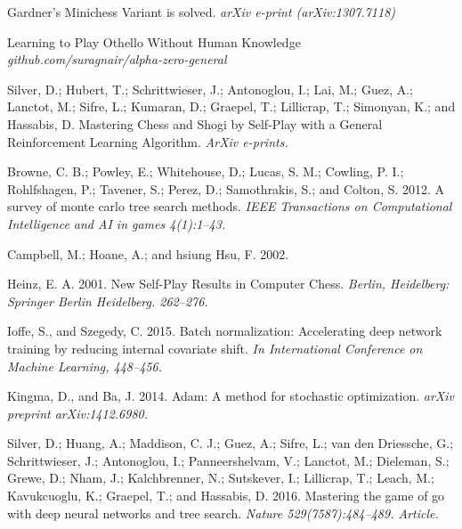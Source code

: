 \documentclass[11pt]{article}
\begin{document}
\begin{thebibliography}{}

\newblock Gardner's Minichess Variant is solved. {\em arXiv e-print (arXiv:1307.7118) }

\newblock Learning to Play Othello Without Human Knowledge {\em github.com/suragnair/alpha-zero-general}

\newblock [Silver et al. 2017a] Silver, D.; Hubert, T.; Schrittwieser, J.; Antonoglou, I.; Lai, M.; Guez, A.; Lanctot, M.; Sifre, L.; Kumaran, D.; Graepel, T.; Lillicrap, T.; Simonyan, K.; and Hassabis, D.
\newblock Mastering Chess and Shogi by Self-Play with a General Reinforcement Learning Algorithm. {\em ArXiv e-prints.}

\newblock [Browne et al. 2012] Browne, C. B.; Powley, E.; Whitehouse, D.; Lucas, S. M.; Cowling, P. I.; Rohlfshagen, P.; Tavener, S.; Perez, D.; Samothrakis, S.; and Colton, S. 2012. 
\newblock A survey of monte carlo tree search methods. {\em IEEE Transactions on Computational Intelligence and AI in games 4(1):1–43.}

 Campbell, M.; Hoane, A.; and hsiung Hsu, F. 2002. 

\newblock [Heinz 2001] Heinz, E. A. 2001. 
\newblock New Self-Play Results in Computer Chess. {\em Berlin, Heidelberg:  Springer Berlin Heidelberg. 262–276.}

 Ioﬀe, S., and Szegedy, C. 2015.
\newblock Batch normalization: Accelerating deep network training by reducing internal covariate shift. {\em In International Conference on Machine Learning, 448–456.}

 Kingma, D., and Ba, J. 2014.  \newblock Adam: A method for stochastic optimization. {\em arXiv preprint arXiv:1412.6980.}

\newblock [Silver et al. 2016] Silver, D.; Huang, A.; Maddison, C. J.; Guez, A.; Sifre, L.; van den Driessche, G.; Schrittwieser, J.; Antonoglou, I.; Panneershelvam, V.; Lanctot, M.; Dieleman, S.; Grewe, D.; Nham, J.; Kalchbrenner, N.; Sutskever, I.; Lillicrap, T.; Leach, M.; Kavukcuoglu, K.; Graepel, T.; and Hassabis, D. 2016. 
\newblock Mastering the game of go with deep neural networks and tree search.  {\em Nature 529(7587):484–489. Article.}



\end{thebibliography}
\end{document}
